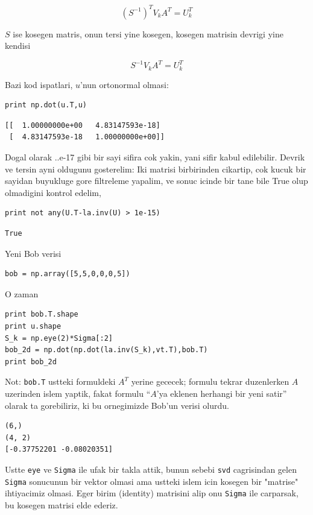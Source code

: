 \documentclass[12pt,fleqn]{article}\usepackage{../common}
\begin{document}
$$ (S^{-1})^T V_k A^T = U_k^T $$

$S$ ise kosegen matris, onun tersi yine kosegen, kosegen matrisin devrigi
yine kendisi

$$ S^{-1} V_k A^T = U_k^T $$

Bazi kod ispatlari, $u$'nun ortonormal olmasi:

\begin{verbatim}
print np.dot(u.T,u)
\end{verbatim}

\begin{verbatim}
[[  1.00000000e+00   4.83147593e-18]
 [  4.83147593e-18   1.00000000e+00]]
\end{verbatim}

Dogal olarak ..e-17 gibi bir sayi sifira cok yakin, yani sifir kabul
edilebilir. Devrik ve tersin ayni oldugunu gosterelim: Iki matrisi
birbirinden cikartip, cok kucuk bir sayidan buyukluge gore filtreleme
yapalim, ve sonuc icinde bir tane bile True olup olmadigini kontrol
edelim,

\begin{verbatim}
print not any(U.T-la.inv(U) > 1e-15)
\end{verbatim}

\begin{verbatim}
True
\end{verbatim}

Yeni Bob verisi 

\begin{verbatim}
bob = np.array([5,5,0,0,0,5]) 
\end{verbatim}

O zaman 

\begin{verbatim}
print bob.T.shape
print u.shape
S_k = np.eye(2)*Sigma[:2]
bob_2d = np.dot(np.dot(la.inv(S_k),vt.T),bob.T)
print bob_2d
\end{verbatim}

Not: \verb!bob.T! ustteki formuldeki $A^T$ yerine gececek; formulu tekrar
duzenlerken $A$ uzerinden islem yaptik, fakat formulu ``$A$'ya eklenen
herhangi bir yeni satir'' olarak ta gorebiliriz, ki bu ornegimizde Bob'un
verisi olurdu. 

\begin{verbatim}
(6,)
(4, 2)
[-0.37752201 -0.08020351]
\end{verbatim}

Ustte \verb!eye! ve \verb!Sigma! ile ufak bir takla attik, bunun sebebi
\verb!svd! cagrisindan gelen \verb!Sigma!  sonucunun bir vektor olmasi ama
ustteki islem icin kosegen bir "matrise" ihtiyacimiz olmasi. Eger birim
(identity) matrisini alip onu \verb!Sigma! ile carparsak, bu kosegen
matrisi elde ederiz.
\end{document}
